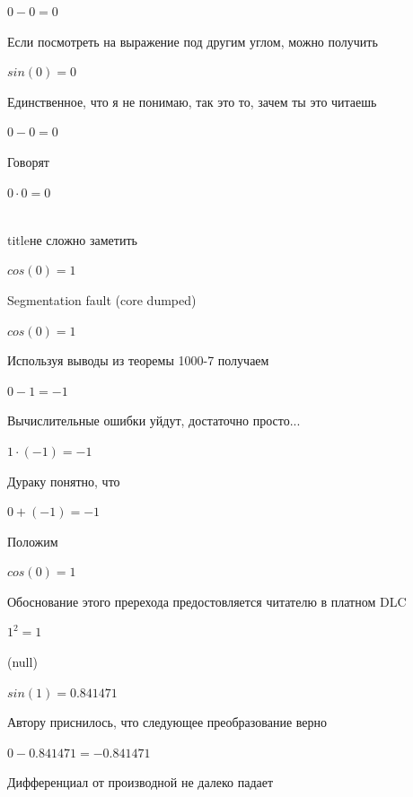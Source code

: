 \documentclass[12pt,a4paper,fleqn]{article}
\begin{document}
\begin{center}$0-0 = 0$\end{center}
Если посмотреть на выражение под другим углом, можно получить

\begin{center}$sin(0) = 0$\end{center}
Единственное, что я не понимаю, так это то, зачем ты это читаешь

\begin{center}$0-0 = 0$\end{center}
Говорят

\begin{center}$0 \cdot 0 = 0$\end{center}
\\ title{не сложно заметить} 

\begin{center}$cos(0) = 1$\end{center}
Segmentation fault (core dumped)

\begin{center}$cos(0) = 1$\end{center}
Используя выводы из теоремы 1000-7 получаем

\begin{center}$0-1 = -1$\end{center}
Вычислительные ошибки уйдут, достаточно просто...

\begin{center}$1 \cdot (-1) = -1$\end{center}
Дураку понятно, что

\begin{center}$0+(-1) = -1$\end{center}
Положим

\begin{center}$cos(0) = 1$\end{center}
Обоснование этого пререхода предостовляется читателю в платном DLC

\begin{center}$1^{2} = 1$\end{center}
(null)\cite{link4}

\begin{center}$sin(1) = 0.841471$\end{center}
Автору приснилось, что следующее преобразование верно

\begin{center}$0-0.841471 = -0.841471$\end{center}
Дифференциал от производной не далеко падает\cite{link2}
\end{document}
